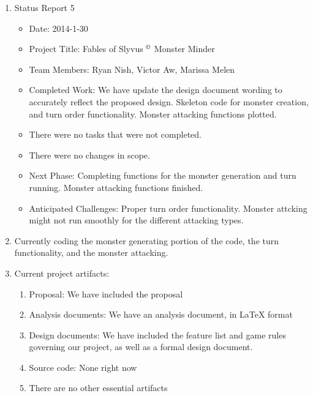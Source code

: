 \documentclass[letterpaper,12pt]{letter}
\begin{document}
\begin{enumerate}
\item Status Report 5
\begin{itemize}
\item Date: 2014-1-30
\item Project Title: Fables of Slyvus $^{\small \copyright}$ Monster Minder
\item Team Members: Ryan Nish, Victor Aw, Marissa Melen
\item Completed Work: We have update the design document wording to
  accurately reflect the proposed design.
  Skeleton code for monster creation, and turn order functionality.  Monster attacking functions plotted.
\item There were no tasks that were not completed.
\item There were no changes in scope.
\item Next Phase: Completing functions for the monster generation and turn running.  Monster attacking functions finished.
\item Anticipated Challenges: Proper turn order functionality.  
Monster attcking might not run smoothly for the different attacking types.
\end{itemize}
\item Currently coding the monster generating portion of the code, the turn functionality, and the monster attacking.
\item Current project artifacts:
\begin{enumerate}
\item Proposal: We have included the proposal 
\item Analysis documents: We have an analysis document, in LaTeX format
\item Design documents: We have included the feature list and game
  rules governing our project, as well as a formal design document.
\item Source code: None right now
\item There are no other essential artifacts
\end{enumerate}
\end{enumerate}
\end{document}

